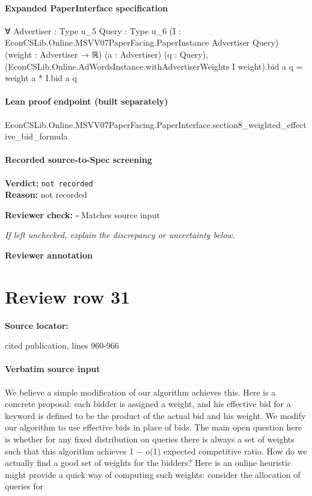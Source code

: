 \documentclass[10pt]{article}
\newcommand{\reviewerbox}{%
  \par\noindent\fbox{\parbox{0.96\linewidth}{\rule{0pt}{0.38in}}}\par
}
\newcommand{\reviewmatch}[1]{%
  \par\noindent\textbf{Reviewer check:} $\square$\; #1\par
  \noindent\emph{If left unchecked, explain the discrepancy or uncertainty below.}\par
}
\begin{document}
\paragraph{Expanded PaperInterface specification}
\begin{ReviewVerbatim}
∀ {Advertiser : Type u_5} {Query : Type u_6} (I : EconCSLib.Online.MSVV07PaperFacing.PaperInstance Advertiser Query)
  (weight : Advertiser → ℝ) (a : Advertiser) (q : Query),
  (EconCSLib.Online.AdWordsInstance.withAdvertiserWeights I weight).bid a q = weight a * I.bid a q
\end{ReviewVerbatim}

\paragraph{Lean proof endpoint (built separately)}\begin{ReviewVerbatim}
EconCSLib.Online.MSVV07PaperFacing.PaperInterface.section8_weighted_effective_bid_formula
\end{ReviewVerbatim}

\paragraph{Recorded source-to-Spec screening}
\textbf{Verdict:} \texttt{not recorded}
\\
\textbf{Reason:} not recorded
\reviewmatch{Matches source input}
\noindent\textbf{Reviewer annotation}\par
\reviewerbox
\clearpage
\hypertarget{source-claim-d3fac37f5939cc7e}{}
\section*{Review row 31}
\textbf{Source locator:} {\footnotesize\raggedright cited publication, lines 960-\allowbreak{}966\par}
\paragraph{Verbatim source input}
\begin{ReviewVerbatim}
We believe a simple modification of our algorithm achieves this. Here is a concrete proposal:
each bidder is assigned a weight, and his effective bid for a keyword is defined to be the product
of the actual bid and his weight. We modify our algorithm to use effective bids in place of
bids. The main open question here is whether for any fixed distribution on queries there is
always a set of weights such that this algorithm achieves 1 − o(1) expected competitive ratio.
How do we actually find a good set of weights for the bidders? Here is an online heuristic
might provide a quick way of computing such weights: consider the allocation of queries for
\end{ReviewVerbatim}
\end{document}
